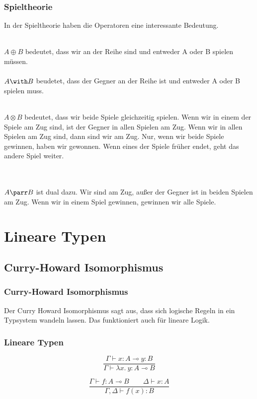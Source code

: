 \documentclass{beamer}
\begin{document}
\begin{frame}
  \frametitle{Spieltheorie}
  In der Spieltheorie haben die Operatoren eine interessante Bedeutung. \\~\\ \pause

  $A \oplus B$ bedeutet, dass wir an der Reihe sind und entweder A oder B spielen müssen. \\~\\ \pause
  $A \with B$ beudetet, dass der Gegner an der Reihe ist und entweder A oder B spielen muss. \\~\\ \pause

  $A \otimes B$ bedeutet, dass wir beide Spiele gleichzeitig spielen. Wenn wir in einem der Spiele am Zug sind, ist der Gegner in allen Spielen am Zug. Wenn wir in allen Spielen am Zug sind, dann sind wir am Zug. Nur, wenn wir beide Spiele gewinnen, haben wir gewonnen. Wenn eines der Spiele früher endet, geht das andere Spiel weiter.

  \\~\\ \pause
  $A \parr B$ ist dual dazu. Wir sind am Zug, außer der Gegner ist in beiden Spielen am Zug. Wenn wir in einem Spiel gewinnen, gewinnen wir alle Spiele. 
\end{frame}

\section{Lineare Typen}
\subsection{Curry-Howard Isomorphismus}
\begin{frame}
  \frametitle{Curry-Howard Isomorphismus}

  Der Curry Howard Isomorphismus sagt aus, dass sich logische Regeln in ein Typsystem wandeln lassen. Das funktioniert auch für lineare Logik.
\end{frame}

\begin{frame}
  \frametitle{Lineare Typen}
    
  \begin{equation}
    \frac{\Gamma \vdash x : A \multimap y : B}
         {\Gamma \vdash \lambda x.\ y : A \multimap B}
  \end{equation}

  \pause%

  \begin{equation}
    \frac{\Gamma \vdash f : A \multimap B \qquad \Delta \vdash x : A}
         {\Gamma, \Delta \vdash f(x) : B}
  \end{equation}
\end{frame}
\end{document}
